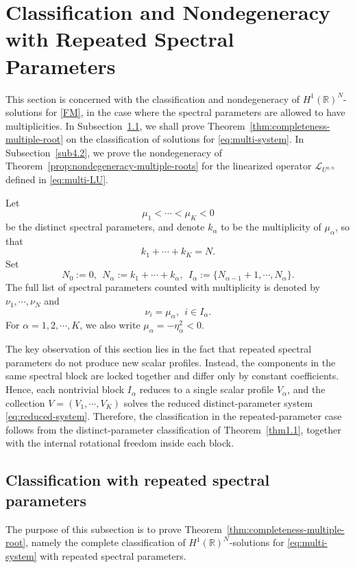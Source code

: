\documentclass[11pt]{article}
\numberwithin{equation}{section}
\theoremstyle{definition}
\begin{document}
\section{Classification and Nondegeneracy with Repeated Spectral Parameters}
\label{sec:multiple-spectral-parameters}
This section is concerned with the classification and nondegeneracy of \(H^1(\mathbb R)^N\)-solutions for \eqref{FM}, in the case where the spectral parameters are allowed to have multiplicities. In Subsection~\ref{sub4.1}, we shall prove  Theorem~\ref{thm:completeness-multiple-root} on the classification of solutions for \eqref{eq:multi-system}. In Subsection~\ref{sub4.2}, we prove the   nondegeneracy of Theorem~\ref{prop:nondegeneracy-multiple-roots}  for the linearized operator \(\mathcal L_{U^{a,n}}\) defined in \eqref{eq:multi-LU}.

Let
\[
\mu_1<\cdots<\mu_K<0
\]
be the distinct spectral parameters, and denote \(k_\alpha\) to be the
multiplicity of \(\mu_\alpha\), so that
\[
k_1+\cdots+k_K=N.
\]
Set
\[
N_0:=0,\ \
N_\alpha:=k_1+\cdots+k_\alpha,
\ \
I_\alpha:=\{N_{\alpha-1}+1,\cdots,N_\alpha\}.
\]
The full list of spectral parameters counted with multiplicity is denoted
by \(\nu_1,\cdots,\nu_N\) and
\[
\nu_i=\mu_\alpha,\ \  i\in I_\alpha.
\]
For $\alpha=1,2,\cdots,K$, we also write
$
\mu_\alpha=-\eta_\alpha^2<0$.



The key observation of   this section lies in the fact that repeated spectral parameters do not produce new
scalar profiles. Instead, the components in the same spectral block are
locked together and differ only by constant coefficients. Hence, each
nontrivial block \(I_\alpha\) reduces to a single scalar profile
\(V_\alpha\), and the collection \(V=(V_1,\cdots,V_K)\) solves the reduced
distinct-parameter system \eqref{eq:reduced-system}. Therefore, the
classification in the repeated-parameter case follows from the
distinct-parameter classification of Theorem~\ref{thm1.1}, together with the
internal rotational freedom inside each block.



\subsection{Classification with repeated spectral parameters}\label{sub4.1}
The purpose of this subsection is to prove
Theorem~\ref{thm:completeness-multiple-root}, namely the complete
classification of \(H^1(\mathbb R)^N\)-solutions for
\eqref{eq:multi-system} with repeated spectral parameters.
\end{document}

